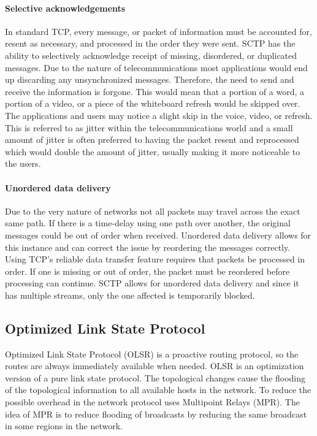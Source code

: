 \documentclass[a4paper]{article}
\begin{document}
\paragraph{Selective acknowledgements}
In standard TCP, every message, or packet of information must be accounted for, resent as necessary, and processed in the order they were sent. SCTP has the ability to selectively acknowledge receipt of missing, disordered, or duplicated messages. Due to the nature of telecommunications most applications would end up discarding any unsynchronized messages. Therefore, the need to send and receive the information is forgone. This would mean that a portion of a word, a portion of a video, or a piece of the whiteboard refresh would be skipped over. The applications and users may notice a slight skip in the voice, video, or refresh. This is referred to as jitter within the telecommunications world and a small amount of jitter is often preferred to having the packet resent and reprocessed which would double the amount of jitter, usually making it more noticeable to the users.

\paragraph{Unordered data delivery}
Due to the very nature of networks not all packets may travel across the exact same path. If there is a time-delay using one path over another, the original messages could be out of order when received. Unordered data delivery allows for this instance and can correct the issue by reordering the messages correctly. Using TCP’s reliable data transfer feature requires that packets be processed in order. If one is missing or out of order, the packet must be reordered before processing can continue. SCTP allows for unordered data delivery and since it has multiple streams, only the one affected is temporarily blocked.

\subsection{Optimized Link State Protocol}
Optimized Link State Protocol (OLSR) is a proactive routing protocol, so the routes are always immediately available when needed. OLSR is an optimization version of a pure link state protocol. The topological changes cause the flooding of the topological information to all available hosts in the network. To reduce the possible overhead in the network protocol uses Multipoint Relays (MPR). The idea of MPR is to reduce flooding of broadcasts by reducing the same broadcast in some regions in the network.
\end{document}

